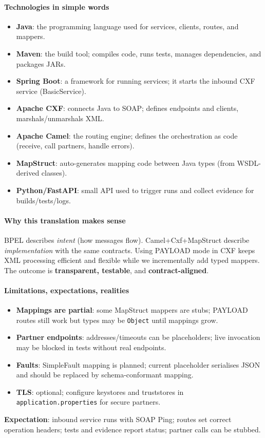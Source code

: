 \documentclass[11pt,a4paper]{article}
\begin{document}
\paragraph*{Technologies in simple words}
\begin{itemize}
  \item \textbf{Java}: the programming language used for services, clients, routes, and mappers.\
  \item \textbf{Maven}: the build tool; compiles code, runs tests, manages dependencies, and packages JARs.\
  \item \textbf{Spring Boot}: a framework for running services; it starts the inbound CXF service (BasicService).\
  \item \textbf{Apache CXF}: connects Java to SOAP; defines endpoints and clients, marshals/unmarshals XML.\
  \item \textbf{Apache Camel}: the routing engine; defines the orchestration as code (receive, call partners, handle errors).\
  \item \textbf{MapStruct}: auto-generates mapping code between Java types (from WSDL-derived classes).\
  \item \textbf{Python/FastAPI}: small API used to trigger runs and collect evidence for builds/tests/logs.\
\end{itemize}

\paragraph*{Why this translation makes sense}
BPEL describes \textit{intent} (how messages flow). Camel+Cxf+MapStruct describe \textit{implementation} with the same contracts. Using PAYLOAD mode in CXF keeps XML processing efficient and flexible while we incrementally add typed mappers. The outcome is \textbf{transparent, testable}, and \textbf{contract-aligned}.

\paragraph*{Limitations, expectations, realities}
\begin{itemize}
  \item \textbf{Mappings are partial}: some MapStruct mappers are stubs; PAYLOAD routes still work but types may be \texttt{Object} until mappings grow.\
  \item \textbf{Partner endpoints}: addresses/timeouts can be placeholders; live invocation may be blocked in tests without real endpoints.\
  \item \textbf{Faults}: SimpleFault mapping is planned; current placeholder serialises JSON and should be replaced by schema-conformant mapping.\
  \item \textbf{TLS}: optional; configure keystores and truststores in \texttt{application.properties} for secure partners.\
\end{itemize}
\textbf{Expectation}: inbound service runs with SOAP Ping; routes set correct operation headers; tests and evidence report status; partner calls can be stubbed.
\end{document}
